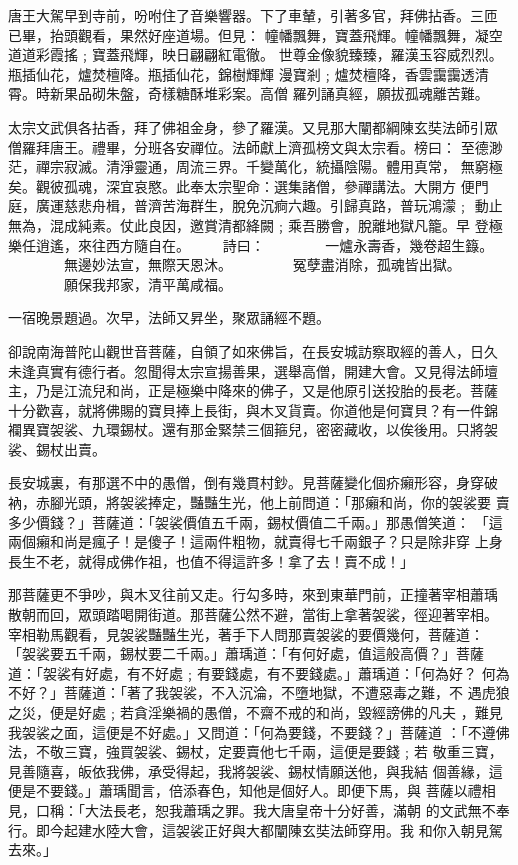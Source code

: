 \begin{pinyinscope}
{唐王大駕早到寺前，吩咐住了音樂響器。下了車輦，引著多官，拜佛拈香。三匝
已畢，抬頭觀看，果然好座道場。但見：
幢幡飄舞，寶蓋飛輝。幢幡飄舞，凝空道道彩霞搖﹔寶蓋飛輝，映日翩翩紅電徹。
世尊金像貌臻臻，羅漢玉容威烈烈。瓶插仙花，爐焚檀降。瓶插仙花，錦樹輝輝
漫寶剎﹔爐焚檀降，香雲靄靄透清霄。時新果品砌朱盤，奇樣糖酥堆彩案。高僧
羅列誦真經，願拔孤魂離苦難。

太宗文武俱各拈香，拜了佛祖金身，參了羅漢。又見那大闡都綱陳玄奘法師引眾
僧羅拜唐王。禮畢，分班各安禪位。法師獻上濟孤榜文與太宗看。榜曰：
至德渺茫，禪宗寂滅。清淨靈通，周流三界。千變萬化，統攝陰陽。體用真常，
無窮極矣。觀彼孤魂，深宜哀愍。此奉太宗聖命：選集諸僧，參禪講法。大開方
便門庭，廣運慈悲舟楫，普濟苦海群生，脫免沉痾六趣。引歸真路，普玩鴻濛﹔
動止無為，混成純素。仗此良因，邀賞清都絳闕﹔乘吾勝會，脫離地獄凡籠。早
登極樂任逍遙，來往西方隨自在。
　　詩曰：
　　　　一爐永壽香，幾卷超生籙。
　　　　無邊妙法宣，無際天恩沐。
　　　　冤孽盡消除，孤魂皆出獄。
　　　　願保我邦家，清平萬咸福。

一宿晚景題過。次早，法師又昇坐，聚眾誦經不題。

卻說南海普陀山觀世音菩薩，自領了如來佛旨，在長安城訪察取經的善人，日久
未逢真實有德行者。忽聞得太宗宣揚善果，選舉高僧，開建大會。又見得法師壇
主，乃是江流兒和尚，正是極樂中降來的佛子，又是他原引送投胎的長老。菩薩
十分歡喜，就將佛賜的寶貝捧上長街，與木叉貨賣。你道他是何寶貝？有一件錦
襴異寶袈裟、九環錫杖。還有那金緊禁三個箍兒，密密藏收，以俟後用。只將袈
裟、錫杖出賣。

長安城裏，有那選不中的愚僧，倒有幾貫村鈔。見菩薩變化個疥癩形容，身穿破
衲，赤腳光頭，將袈裟捧定，豔豔生光，他上前問道：「那癩和尚，你的袈裟要
賣多少價錢？」菩薩道：「袈裟價值五千兩，錫杖價值二千兩。」那愚僧笑道：
「這兩個癩和尚是瘋子！是傻子！這兩件粗物，就賣得七千兩銀子？只是除非穿
上身長生不老，就得成佛作祖，也值不得這許多！拿了去！賣不成！」

那菩薩更不爭吵，與木叉往前又走。行勾多時，來到東華門前，正撞著宰相蕭瑀
散朝而回，眾頭踏喝開街道。那菩薩公然不避，當街上拿著袈裟，徑迎著宰相。
宰相勒馬觀看，見袈裟豔豔生光，著手下人問那賣袈裟的要價幾何，菩薩道：
「袈裟要五千兩，錫杖要二千兩。」蕭瑀道：「有何好處，值這般高價？」菩薩
道：「袈裟有好處，有不好處﹔有要錢處，有不要錢處。」蕭瑀道：「何為好？
何為不好？」菩薩道：「著了我袈裟，不入沉淪，不墮地獄，不遭惡毒之難，不
遇虎狼之災，便是好處﹔若貪淫樂禍的愚僧，不齋不戒的和尚，毀經謗佛的凡夫
，難見我袈裟之面，這便是不好處。」又問道：「何為要錢，不要錢？」菩薩道
：「不遵佛法，不敬三寶，強買袈裟、錫杖，定要賣他七千兩，這便是要錢﹔若
敬重三寶，見善隨喜，皈依我佛，承受得起，我將袈裟、錫杖情願送他，與我結
個善緣，這便是不要錢。」蕭瑀聞言，倍添春色，知他是個好人。即便下馬，與
菩薩以禮相見，口稱：「大法長老，恕我蕭瑀之罪。我大唐皇帝十分好善，滿朝
的文武無不奉行。即今起建水陸大會，這袈裟正好與大都闡陳玄奘法師穿用。我
和你入朝見駕去來。」

}
\end{pinyinscope}
